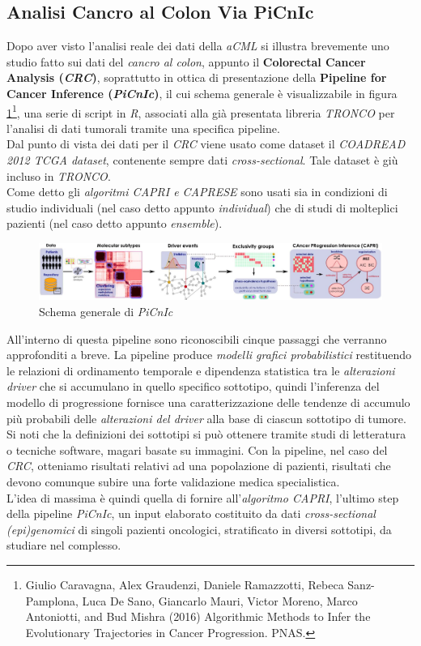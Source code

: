 \documentclass[a4paper,12pt, oneside]{book}
\begin{document}
\subsection{Analisi Cancro al Colon Via PiCnIc}
Dopo aver visto l'analisi reale dei dati della \textit{aCML} si illustra
brevemente uno studio fatto sui dati del \textit{cancro al colon}, appunto il
\textbf{Colorectal Cancer Analysis (\textit{CRC})}, soprattutto 
in ottica di presentazione della \textbf{Pipeline for Cancer Inference
  (\textit{PiCnIc})}, il cui schema generale è visualizzabile in figura
\ref{fig:picnic}\footnote{Giulio Caravagna, Alex Graudenzi, Daniele Ramazzotti,
  Rebeca Sanz-Pamplona, Luca De Sano, Giancarlo Mauri, Victor Moreno, Marco
  Antoniotti, and Bud Mishra (2016) Algorithmic Methods to Infer the
  Evolutionary 
Trajectories in Cancer Progression. PNAS.}, una serie di script in \textit{R},
associati alla già 
presentata libreria \textit{TRONCO} per l'analisi di dati tumorali tramite una
specifica pipeline.\\
Dal punto di vista dei dati per il \textit{CRC} viene usato come
dataset il \textit{COADREAD 2012 TCGA dataset}, contenente sempre dati
\textit{cross-sectional}. Tale dataset è giù incluso in \textit{TRONCO}.\\
Come detto gli \textit{algoritmi CAPRI e CAPRESE} sono usati sia in condizioni
di studio individuali (nel caso detto appunto \textit{individual}) che di studi
di molteplici pazienti (nel caso detto appunto \textit{ensemble}).\\
\begin{figure}
  \centering
  \includegraphics[scale = 0.19]{img/picnic.jpg}
  \caption{Schema generale di \textit{PiCnIc}}
  \label{fig:picnic}
\end{figure}
All'interno di questa pipeline sono riconoscibili cinque passaggi che verranno
approfonditi a breve. La pipeline produce \textit{modelli grafici
  probabilistici} restituendo le relazioni di ordinamento temporale e dipendenza
statistica tra le \textit{alterazioni driver} che si accumulano in quello
specifico sottotipo, quindi l'inferenza del modello di progressione fornisce una
caratterizzazione delle tendenze di accumulo più probabili delle
\textit{alterazioni del driver} alla base di ciascun sottotipo di tumore. Si
noti che la definizioni dei sottotipi si può ottenere tramite studi di
letteratura o tecniche software, magari basate su immagini. Con la pipeline, nel
caso del \textit{CRC}, otteniamo risultati relativi ad una popolazione di
pazienti, risultati che devono comunque subire una forte validazione medica
specialistica. \\
L'idea di massima è quindi quella di fornire all'\textit{algoritmo CAPRI},
l'ultimo step della pipeline \textit{PiCnIc}, un input elaborato costituito da
dati \textit{cross-sectional (epi)genomici} di singoli pazienti oncologici,
stratificato in diversi sottotipi, da studiare nel complesso.
\end{document}

